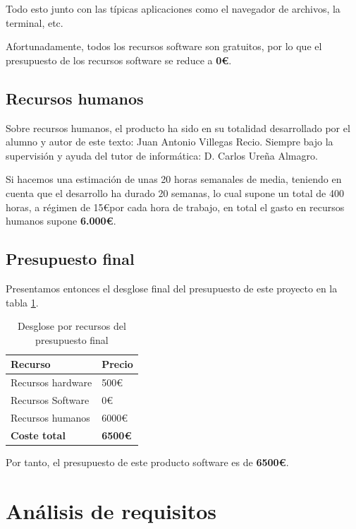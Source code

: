 Todo esto junto con las típicas aplicaciones como el navegador de archivos, la terminal, etc.

Afortunadamente, todos los recursos software son gratuitos, por lo que el presupuesto de los recursos software se reduce a \textbf{0\euro}.

\subsection{Recursos humanos}

Sobre recursos humanos, el producto ha sido en su totalidad desarrollado por el alumno y autor de este texto: Juan Antonio Villegas Recio. Siempre bajo la supervisión y ayuda del tutor de informática: D. Carlos Ureña Almagro.

Si hacemos una estimación de unas 20 horas semanales de media, teniendo en cuenta que el desarrollo ha durado 20 semanas, lo cual supone un total de 400 horas, a régimen de 15\euro por cada hora de trabajo, en total el gasto en recursos humanos supone \textbf{6.000\euro}.

\subsection{Presupuesto final}

Presentamos entonces el desglose final del presupuesto de este proyecto en la tabla \ref{tab:presupuestos}.

\begin{table}[ht]
    \centering
    \begin{tabular}{ll}
    \hline
    \textbf{Recurso}     & \textbf{Precio} \\ \hline
    Recursos hardware    & 500\euro             \\ \hline
    Recursos Software    & 0\euro              \\ \hline
    Recursos humanos     & 6000\euro           \\ \hline
    \textbf{Coste total} & \textbf{6500\euro}  \\ \hline
    \end{tabular}
    \caption{Desglose por recursos del presupuesto final}
    \label{tab:presupuestos}
\end{table}

Por tanto, el presupuesto de este producto software es de \textbf{6500\euro}.

\section{Análisis de requisitos}


